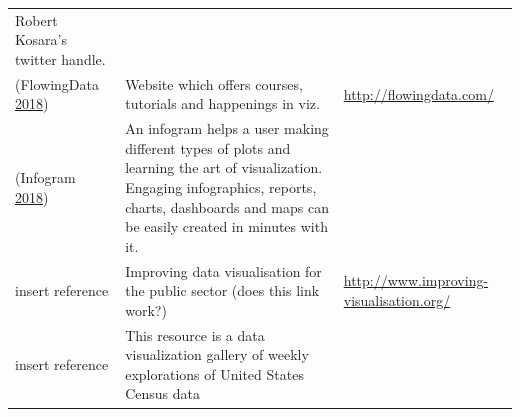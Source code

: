 \documentclass[]{book}
\begin{document}
\begin{longtable}[]{@{}lll@{}}
\begin{minipage}[t]{0.28\columnwidth}
Robert Kosara's twitter handle.\strut
\end{minipage}\tabularnewline
\begin{minipage}[t]{0.15\columnwidth}\raggedright\strut
(FlowingData \protect\hyperlink{ref-flowingdata}{2018})\strut
\end{minipage} & \begin{minipage}[t]{0.28\columnwidth}\raggedright\strut
Website which offers courses, tutorials and happenings in viz.\strut
\end{minipage} & \begin{minipage}[t]{0.48\columnwidth}\raggedright\strut
\url{http://flowingdata.com/}\strut
\end{minipage}\tabularnewline
\begin{minipage}[t]{0.15\columnwidth}\raggedright\strut
(Infogram \protect\hyperlink{ref-infogram}{2018})\strut
\end{minipage} & \begin{minipage}[t]{0.28\columnwidth}\raggedright\strut
An infogram helps a user making different types of plots and learning
the art of visualization. Engaging infographics, reports, charts,
dashboards and maps can be easily created in minutes with it.\strut
\end{minipage} & \begin{minipage}[t]{0.48\columnwidth}\raggedright\strut
\strut
\end{minipage}\tabularnewline
\begin{minipage}[t]{0.15\columnwidth}\raggedright\strut
insert reference\strut
\end{minipage} & \begin{minipage}[t]{0.28\columnwidth}\raggedright\strut
Improving data visualisation for the public sector (does this link
work?)\strut
\end{minipage} & \begin{minipage}[t]{0.48\columnwidth}\raggedright\strut
\url{http://www.improving-visualisation.org/}\strut
\end{minipage}\tabularnewline
\begin{minipage}[t]{0.15\columnwidth}\raggedright\strut
insert reference\strut
\end{minipage} & \begin{minipage}[t]{0.28\columnwidth}\raggedright\strut
This resource is a data visualization gallery of weekly explorations of
United States Census data\strut
\end{minipage} & \begin{minipage}[t]{0.48\columnwidth}\raggedright\strut

\end{minipage}
\end{longtable}
\end{document}
